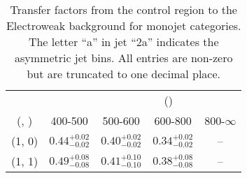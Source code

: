 \begin{table}[h!]
\tiny
\centering
\caption{Transfer factors from the \gj control region to the Electroweak background for monojet categories. The letter ``a'' in jet \eg ``2a''  indicates the asymmetric jet bins. All entries are non-zero but are truncated to one decimal place.\label{tab:tf_gj_total_mono}}
\begin{tabular}
{ccccc}
	\hline\hline
&	& \multicolumn{4}{c}{\scalht (\gev)} \\ 
	 (\njet,  \nb) & 400-500 & 500-600 & 600-800 & 800-$\infty$ \\ [0.8ex] 
\hline
	(1, 0) & $0.44^{+ 0.02 }_{- 0.02 }$ & $0.40^{+ 0.02 }_{- 0.02 }$ & $0.34^{+ 0.02 }_{- 0.02 }$ & -- \\[0.5ex] 
	(1, 1) & $0.49^{+ 0.08 }_{- 0.08 }$ & $0.41^{+ 0.10 }_{- 0.10 }$ & $0.38^{+ 0.08 }_{- 0.08 }$ & -- \\[0.5ex] 
	\hline
	\hline
\end{tabular}
\end{table}
